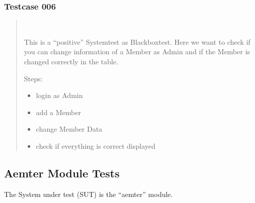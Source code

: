 \documentclass[letterpaper,10pt,english]{sphinxmanual}
\begin{document}
\subsubsection{Testcase 006}
\label{\detokenize{masterCodeDoc:testcase-006}}\begin{quote}


\begin{fulllineitems}
~

\begin{fulllineitems}
This is a “positive” Systemtest as Blackboxtest.
Here we want to check if you can change information of a Member as Admin and if the
Member is changed correctly in the table.

Steps:
\begin{itemize}
\item {} 
login as Admin

\item {} 
add a Member

\item {} 
change Member Data

\item {} 
check if everything is correct displayed

\end{itemize}

\end{fulllineitems}


\end{fulllineitems}

\end{quote}


\subsection{Aemter Module Tests}
\label{\detokenize{masterCodeDoc:aemter-module-tests}}
The System under test (SUT) is the “aemter” module.
\end{document}
